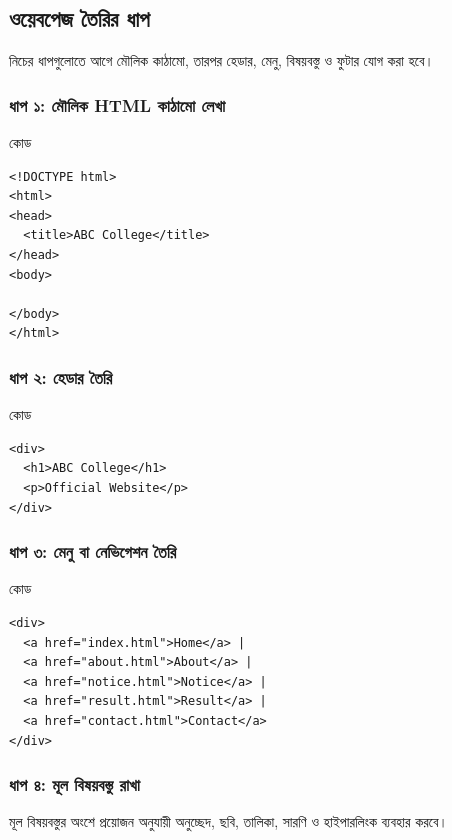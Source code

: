 \subsection{ওয়েবপেজ তৈরির ধাপ}

নিচের ধাপগুলোতে আগে মৌলিক কাঠামো, তারপর হেডার, মেনু, বিষয়বস্তু ও ফুটার যোগ করা হবে।

\subsubsection{ধাপ ১: মৌলিক HTML কাঠামো লেখা}

\begin{examplebox}{কোড}
\begin{verbatim}
<!DOCTYPE html>
<html>
<head>
  <title>ABC College</title>
</head>
<body>

</body>
</html>
\end{verbatim}
\end{examplebox}

\subsubsection{ধাপ ২: হেডার তৈরি}

\begin{examplebox}{কোড}
\begin{verbatim}
<div>
  <h1>ABC College</h1>
  <p>Official Website</p>
</div>
\end{verbatim}
\end{examplebox}

\subsubsection{ধাপ ৩: মেনু বা নেভিগেশন তৈরি}

\begin{examplebox}{কোড}
\begin{verbatim}
<div>
  <a href="index.html">Home</a> |
  <a href="about.html">About</a> |
  <a href="notice.html">Notice</a> |
  <a href="result.html">Result</a> |
  <a href="contact.html">Contact</a>
</div>
\end{verbatim}
\end{examplebox}

\subsubsection{ধাপ ৪: মূল বিষয়বস্তু রাখা}

মূল বিষয়বস্তুর অংশে প্রয়োজন অনুযায়ী অনুচ্ছেদ, ছবি, তালিকা, সারণি ও হাইপারলিংক ব্যবহার করবে।

